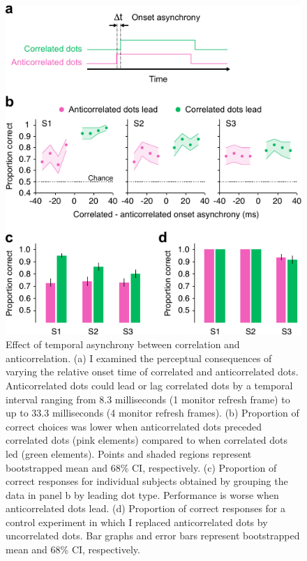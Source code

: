 \begin{figure}
  \centering
  \includegraphics{Fig6}
  \caption[Effect of temporal asynchrony between correlation and anticorrelation.]{Effect of temporal asynchrony between correlation and anticorrelation. (a) I examined the perceptual consequences of varying the relative onset time of correlated and anticorrelated dots. Anticorrelated dots could lead or lag correlated dots by a temporal interval ranging from 8.3 milliseconds (1 monitor refresh frame) to up to 33.3 milliseconds (4 monitor refresh frames). (b) Proportion of correct choices was lower when anticorrelated dots preceded correlated dots (pink elements) compared to when correlated dots led (green elements). Points and shaded regions represent bootstrapped mean and 68\% CI, respectively. (c) Proportion of correct responses for individual subjects obtained by grouping the data in panel b by leading dot type. Performance is worse when anticorrelated dots lead. (d) Proportion of correct responses for a control experiment in which I replaced anticorrelated dots by uncorrelated dots. Bar graphs and error bars represent bootstrapped mean and 68\% CI, respectively.}
  \label{fig:c2f6}
\end{figure}



